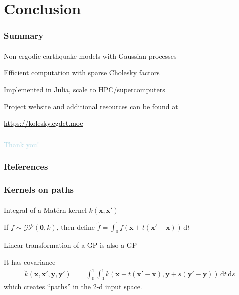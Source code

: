 \documentclass{beamer}                             %
\newcommand*{\GP}{\mathcal{GP}}
\newcommand*{\dd}{\, \text{d}}
\renewcommand*{\vec}[1]{\bm{#1}}
\newenvironment{wideitemize}
  {\itemize\setlength{\itemsep}{0.5cm}}
  {\enditemize}
\begin{document}
\section{Conclusion}

\begin{frame}
\frametitle{Summary}
\framesubtitle{}

\begin{wideitemize}
  \item Non-ergodic earthquake models with Gaussian processes
  \item Efficient computation with sparse Cholesky factors
  \item Implemented in Julia, scale to HPC/supercomputers
  \item Project website and additional resources can be found at
    \begin{center}
      \url{https://kolesky.cgdct.moe}
    \end{center}
\end{wideitemize}
\end{frame}

\begin{frame}
\frametitle{}
\framesubtitle{}

\begin{minipage}[c][0.99\textheight][c]{\linewidth}
  \centering
  {\huge \textcolor{lightblue}{Thank you!}} \\
\end{minipage}
\end{frame}

\begin{frame}[allowframebreaks]
\frametitle{References}
\framesubtitle{}

\printbibliography
\end{frame}

\begin{frame}
\frametitle{Kernels on paths}
\framesubtitle{}

\begin{wideitemize}
  \item Integral of a Mat{\'e}rn kernel \( k(\vec{x}, \vec{x}') \)
  \item If \( f \sim \GP(\vec{0}, k) \), then define \(
    \widetilde{f} = \int_0^1 f(\vec{x} + t(\vec{x}' - \vec{x})) \dd t \)
  \item Linear transformation of a GP is also a GP
  \item It has covariance
    \begin{align*}
      \widetilde{k}(\vec{x}, \vec{x}', \vec{y}, \vec{y}') &=
        \int_0^1 \int_0^1
          k(\vec{x} + t(\vec{x}' - \vec{x}), \vec{y} + s(\vec{y}' - \vec{y}))
        \dd t \dd s
    \end{align*}
    which creates ``paths'' in the 2-d input space.
\end{wideitemize}
\end{frame}
\end{document}
